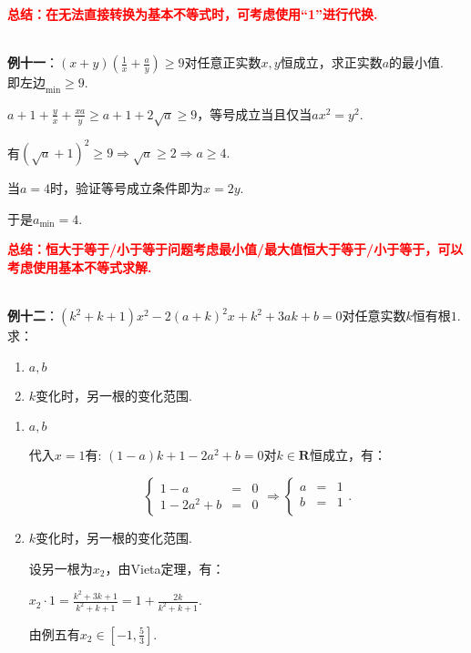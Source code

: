 \documentclass[8pt]{article}
\begin{document}
					\textcolor{red}{\textbf{总结：在无法直接转换为基本不等式时，可考虑使用“1”进行代换.}}

				~\\

				\textbf{例十一}：$\displaystyle (x+y)\left(\frac{1}{x}+\frac{a}{y}\right)\geq 9$对任意正实数$x, y$恒成立，求正实数$a$的最小值.
					~\\

					即$\text{左边}_{\min} \geq 9$.

					$\displaystyle a+1+\frac{y}{x}+\frac{xa}{y}\geq a+1+2\sqrt{a}\geq 9$，等号成立当且仅当$ax^2=y^2.$

					有$(\sqrt{a}+1)^2\geq 9 \Rightarrow \sqrt{a}\geq 2 \Rightarrow a\geq 4.$

					当$a=4$时，验证等号成立条件即为$x=2y$.

					于是$a_{\min}=4.$

					\textcolor{red}{\textbf{总结：恒大于等于/小于等于问题考虑最小值/最大值恒大于等于/小于等于，可以考虑使用基本不等式求解.}}

				~\\

				\textbf{例十二}：$(k^2+k+1)x^2-2(a+k)^2x+k^2+3ak+b=0$对任意实数$k$恒有根$1$. 求：
					\begin{enumerate}[label=(\arabic*)]
						\item $a, b$
						\item $k$变化时，另一根的变化范围.
					\end{enumerate}

					\begin{enumerate}[label=(\arabic*)]
						\item $a, b$

							代入$x=1$有: $(1-a)k+1-2a^2+b=0$对$k\in\mathbf{R}$恒成立，有：

							$$
							\left\{
							\begin{array}{rcl}
								1-a&=&0\\
								1-2a^2+b&=&0
							\end{array}
							\right.
							\Rightarrow
							\left\{
							\begin{array}{rcl}
								a&=&1\\
								b&=&1\\
							\end{array}
							\right..
							$$

						\item $k$变化时，另一根的变化范围.

							设另一根为$x_2$，由Vieta定理，有：

							$\displaystyle x_2\cdot1=\frac{k^2+3k+1}{k^2+k+1}=1+\frac{2k}{k^2+k+1}.$

							由例五有$\displaystyle x_2\in\left[-1, \frac{5}{3}\right].$

					\end{enumerate}
\end{document}
